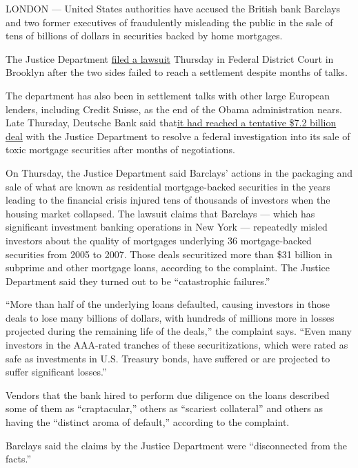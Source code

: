 LONDON --- United States authorities have accused the British bank
Barclays and two former executives of fraudulently misleading the public
in the sale of tens of billions of dollars in securities backed by home
mortgages.

The Justice Department
\href{https://www.justice.gov/opa/pr/united-states-sues-barclays-bank-recover-civil-penalties-fraud-sale-residential-mortgage}{filed
a lawsuit} Thursday in Federal District Court in Brooklyn after the two
sides failed to reach a settlement despite months of talks.

The department has also been in settlement talks with other large
European lenders, including Credit Suisse, as the end of the Obama
administration nears. Late Thursday, Deutsche Bank said
that\href{http://www.nytimes.com/2016/12/22/business/dealbook/deutsche-bank-mortgage-securities-justice-department-homeowners.html}{it
had reached a tentative \$7.2 billion deal} with the Justice Department
to resolve a federal investigation into its sale of toxic mortgage
securities after months of negotiations.

On Thursday, the Justice Department said Barclays' actions in the
packaging and sale of what are known as residential mortgage-backed
securities in the years leading to the financial crisis injured tens of
thousands of investors when the housing market collapsed. The lawsuit
claims that Barclays --- which has significant investment banking
operations in New York --- repeatedly misled investors about the quality
of mortgages underlying 36 mortgage-backed securities from 2005 to 2007.
Those deals securitized more than \$31 billion in subprime and other
mortgage loans, according to the complaint. The Justice Department said
they turned out to be ``catastrophic failures.''

``More than half of the underlying loans defaulted, causing investors in
those deals to lose many billions of dollars, with hundreds of millions
more in losses projected during the remaining life of the deals,'' the
complaint says. ``Even many investors in the AAA-rated tranches of these
securitizations, which were rated as safe as investments in U.S.
Treasury bonds, have suffered or are projected to suffer significant
losses.''

Vendors that the bank hired to perform due diligence on the loans
described some of them as ``craptacular,'' others as ``scariest
collateral'' and others as having the ``distinct aroma of default,''
according to the complaint.

Barclays said the claims by the Justice Department were ``disconnected
from the facts.''

